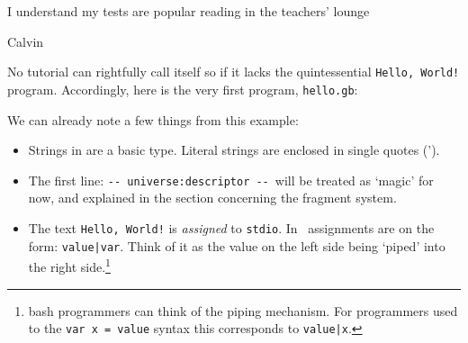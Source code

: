 \epigraph{I understand my tests are popular reading in the teachers' lounge}{Calvin}

No tutorial can rightfully call itself so if it lacks the
quintessential \texttt{Hello, World!} program. Accordingly, here is
the very first \gbeta program, \texttt{hello.gb}:



We can already note a few things from this example:

\begin{itemize}\setlength{\itemsep}{-2pt}
  \item Strings in \gbeta are a basic type. Literal strings are
    enclosed in single quotes (').
  \item The first line: \verb|-- universe:descriptor --|\ will be
    treated as `magic' for now, and explained in the section
    concerning the fragment system.
  \item The text \texttt{Hello, World!} is \emph{assigned} to
    \texttt{stdio}. In \gbeta\ assignments are on the form:
    \texttt{value|var}. Think of it as the value on the left side
    being `piped' into the right side.\footnote{bash programmers can
      think of the piping mechanism. For programmers used to the
      \texttt{var x = value} syntax this corresponds to \texttt{value|x}.}
\end{itemize}